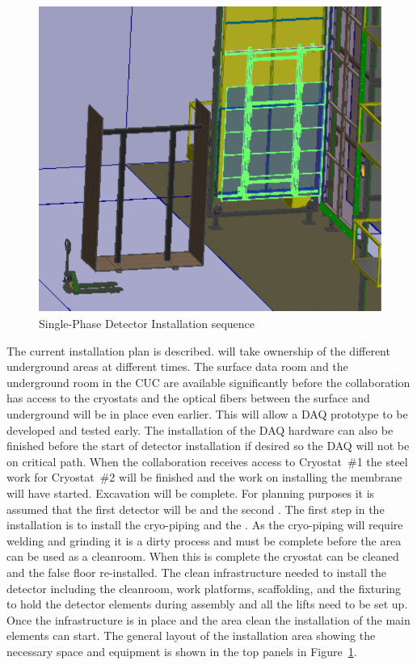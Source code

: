 \begin{figure}[!htb]
\begin{center}
\begin{minipage}[c]{0.32\textwidth}
\end{minipage}
\begin{minipage}[c]{0.32\textwidth}
\includegraphics[width=\textwidth]{far-detector-single-phase/figures/CPA-3.pdf}
\end{minipage}

\caption{Single-Phase Detector Installation sequence}
\label{Install-Seq}
\end{center}
\end{figure}

The current installation plan is described.  will take
ownership of the different underground areas at different times. The
surface data room and the underground room in the CUC are available
significantly before the collaboration has access to the cryostats and
the optical fibers between the surface and underground will be in
place even earlier. This will allow a DAQ prototype to be developed
and tested early. The installation of the DAQ hardware can also be
finished before the start of detector installation if desired so the
DAQ will not be on critical path.  When the collaboration receives
access to Cryostat~\#1 the steel work for Cryostat~\#2 will be
finished and the work on installing the membrane will have
started. Excavation will be complete.  For planning purposes it is
assumed that the first detector will be  and the second
. The first step in the  installation is to
install the cryo-piping and the . As the cryo-piping will
require welding and grinding it is a dirty process and must be
complete before the area can be used as a cleanroom. When this is
complete the cryostat can be cleaned and the false floor
re-installed. The clean infrastructure needed to install the detector
including the cleanroom, work platforms, scaffolding, and the
fixturing to hold the detector elements during assembly and all the
lifts need to be set up. Once the infrastructure is in place and the
area clean the installation of the main elements can start. The
general layout of the installation area showing the necessary space
and equipment is shown in the top panels in Figure~\ref{Install-Seq}.

